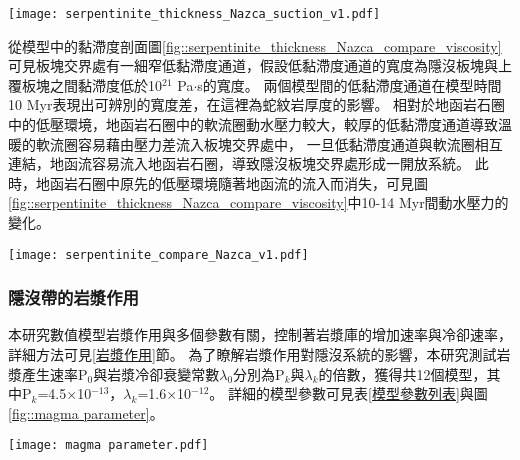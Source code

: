 \begin{figure*}[ht!]
    \centering
    \texttt{[image: serpentinite\_thickness\_Nazca\_suction\_v1.pdf]}
    \caption[測試蛇紋岩厚度模型之動水壓力力矩]{測試蛇紋岩厚度模型之動水壓力力矩，模型與圖\ref{fig::slab_geometry_serpentinite_thickness_Nazca_top}所使用的圖例相同。}
    \label{fig::serpentinite_thickness_Nazca_suction}
\end{figure*}
從模型中的黏滯度剖面圖\ref{fig::serpentinite_thickness_Nazca_compare_viscosity}可見板塊交界處有一細窄低黏滯度通道，假設低黏滯度通道的寬度為隱沒板塊與上覆板塊之間黏滯度低於10$^{21}$ Pa$\cdot$s的寬度。
兩個模型間的低黏滯度通道在模型時間10 Myr表現出可辨別的寬度差，在這裡為蛇紋岩厚度的影響。
相對於地函岩石圈中的低壓環境，地函岩石圈中的軟流圈動水壓力較大，較厚的低黏滯度通道導致溫暖的軟流圈容易藉由壓力差流入板塊交界處中，
一旦低黏滯度通道與軟流圈相互連結，地函流容易流入地函岩石圈，導致隱沒板塊交界處形成一開放系統。
此時，地函岩石圈中原先的低壓環境隨著地函流的流入而消失，可見圖\ref{fig::serpentinite_thickness_Nazca_compare_viscosity}中10-14 Myr間動水壓力的變化。

\begin{figure*}[htp!]
    \centering
    \texttt{[image: serpentinite\_compare\_Nazca\_v1.pdf]}
    \caption[測試蛇紋岩厚度模型於5 Myr、10 Myr、12 Myr與14 Myr之黏滯度與動水壓力剖面]{測試蛇紋岩厚度模型於5 Myr、10 Myr、12 Myr與14 Myr之黏滯度與動水壓力剖面。(a)蛇紋岩厚度為5公里的模型黏滯度剖面。(b)蛇紋岩厚度為7.5公里的模型黏滯度剖面。(c)蛇紋岩厚度為5公里的模型動水壓力剖面。(d)蛇紋岩厚度為7.5公里的模型動水壓力剖面。}
    \label{fig::serpentinite_thickness_Nazca_compare_viscosity}
\end{figure*}

\subsubsection{隱沒帶的岩漿作用}
本研究數值模型岩漿作用與多個參數有關，控制著岩漿庫的增加速率與冷卻速率，詳細方法可見\ref{岩漿作用}節。
為了瞭解岩漿作用對隱沒系統的影響，本研究測試岩漿產生速率P$_0$與岩漿冷卻衰變常數$\lambda_0$分別為P$_k$與$\lambda_k$的倍數，獲得共12個模型，其中P$_k$=4.5$\times$10$^{-13}$，$\lambda_k$=1.6$\times$10$^{-12}$。
詳細的模型參數可見表\ref{模型參數列表}與圖\ref{fig::magma parameter}。

\begin{figure*}[ht]
    \centering
    \texttt{[image: magma parameter.pdf]}
    \caption[智利模型岩漿參數測試示意圖，詳細岩漿參數見表\ref{模型參數列表}]{智利模型岩漿參數測試示意圖，詳細岩漿參數見表\ref{模型參數列表}。底部顏色為圖\ref{fig::magma_area_compare_Nazca}中的說明顏色。}
    \label{fig::magma parameter}
\end{figure*}

